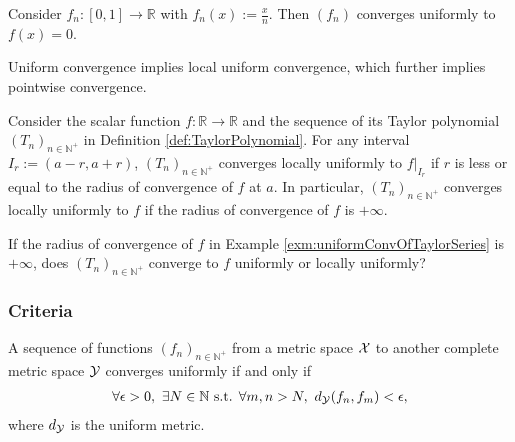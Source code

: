 \begin{exm}
  Consider $f_n:[0,1]\rightarrow \mathbb{R}$
   with $f_n(x):=\frac{x}{n}$.
  Then $(f_n)$ converges uniformly to $f(x)=0$.
\end{exm}

\begin{thm}
  \label{thm:funcConvergenceRelations}
  Uniform convergence implies local uniform convergence,
  which further implies pointwise convergence.
\end{thm}

\begin{exm}
  \label{exm:uniformConvOfTaylorSeries}
  Consider the scalar function $f:\mathbb{R}\rightarrow\mathbb{R}$
   and the sequence of its Taylor polynomial
   $(T_n)_{n\in\mathbb{N}^+}$ in Definition \ref{def:TaylorPolynomial}.
  For any interval \mbox{$I_r:=(a-r,a+r)$},
  $(T_n)_{n\in\mathbb{N}^+}$ converges locally uniformly
  to $f|_{I_r}$ if $r$ is less or equal to the radius of convergence
  of $f$ at $a$.
  In particular,
  $(T_n)_{n\in\mathbb{N}^+}$ converges locally uniformly to $f$
  if the radius of convergence of $f$ is $+\infty$.
\end{exm}

\begin{exc}
  If the radius of convergence of $f$ in
  Example \ref{exm:uniformConvOfTaylorSeries} 
  is $+\infty$,
  does $(T_n)_{n\in\mathbb{N}^+}$ converge to $f$
  uniformly or locally uniformly?
\end{exc}


\subsubsection{Criteria}

\begin{thm}
  \label{thm:CauchyCriterionUniformConv}
  A sequence of functions $(f_n)_{n\in\mathbb{N}^+}$ 
  from a metric space ${\cal X}$
  to another complete metric space ${\cal Y}$
  converges uniformly if and only if
  \begin{equation}
    \label{eq:CauchyCriterionUniformConv}
    \begin{array}{l}
    \forall \epsilon>0,\ \exists N\in\mathbb{N} \text{ s.t. }
    \forall m,n > N,\
    d_{\cal Y}(f_n, f_m) < \epsilon, 
    \end{array}
  \end{equation}
  where $d_{\cal Y}$ is the uniform metric. 
\end{thm}


